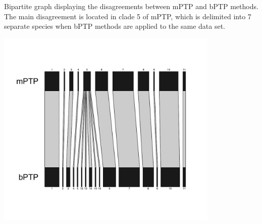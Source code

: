 \documentclass[11pt]{article}
\begin{document}
\begin{suppfigure}
\centering
\caption{
Bipartite graph displaying the disagreements between mPTP and bPTP methods. The main disagreement is located in clade 5 of mPTP, which is delimited into 7 separate species when bPTP methods are applied to the same data set.
}
\includegraphics[width=0.8\textwidth]{supplementaryinfo/web.mPTP.bPTP-edited.pdf}
\label{fig:genetree5}
\end{suppfigure}
\clearpage
\end{document}
